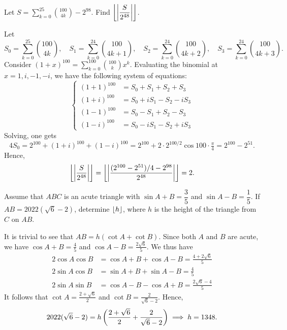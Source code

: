 \begin{question}[2]\label{Q::2021-O-1-14}
    Let $S = \displaystyle\sum_{k=0}^{25} \binom{100}{4k} - 2^{98}$. Find $\left\lfloor \left\lvert \dfrac{S}{2^{48}} \right\rvert \right\rfloor$.
\end{question}
\begin{solution*}
    Let \[S_0 = \sum_{k=0}^{25} \binom{100}{4k}, \quad S_1 = \sum_{k=0}^{24} \binom{100}{4k+1}, \quad S_2 = \sum_{k=0}^{24} \binom{100}{4k+2}, \quad S_3 = \sum_{k=0}^{24} \binom{100}{4k+3}.\] Consider $(1 + x)^{100} = \displaystyle\sum_{k=0}^{100} \binom{100}{k} x^{k}$. Evaluating the binomial at $x = 1, i, -1, -i$, we have the following system of equations: \[\left\{
        \begin{aligned}
            (1+1)^{100} &= S_0 + S_1 + S_2 + S_3\\
            (1+i)^{100} &= S_0 + iS_1 - S_2 - iS_3\\
            (1-1)^{100} &= S_0 - S_1 + S_2 - S_3\\
            (1-i)^{100} &= S_0 - iS_1 - S_2 + iS_3
        \end{aligned}\right.\] Solving, one gets \[4S_0 = 2^{100} + (1+i)^{100} + (1-i)^{100} = 2^{100} + 2 \cdot 2^{100/2}\cos{100 \cdot \tfrac{\pi}4} = 2^{100} - 2^{51}.\] Hence, \[\left\lfloor \left\lvert \frac{S}{2^{48}} \right\rvert \right\rfloor = \left\lfloor \left\lvert \frac{(2^{100} - 2^{51})/4 - 2^{98}}{2^{48}} \right\rvert \right\rfloor = 2.\]
\end{solution*}

\begin{question}[1348]\label{Q::2021-O-1-15}
    Assume that $ABC$ is an acute triangle with $\sin{A + B} = \dfrac35$ and $\sin{A-B} = \dfrac15$. If $AB = 2022(\sqrt6 - 2)$, determine $\left\lfloor h \right\rfloor$, where $h$ is the height of the triangle from $C$ on $AB$.
\end{question}
\begin{solution*}
    It is trivial to see that $AB = h(\cot A + \cot B)$. Since both $A$ and $B$ are acute, we have $\cos{A+B} = \frac45$ and $\cos{A-B} = \frac{2\sqrt{6}}{5}$. We thus have
    \begin{align*}
        2\cos A \cos B &= \cos{A + B} + \cos{A - B} = \frac{4 + 2\sqrt6}{5}\\
        2\sin A \cos B &= \sin{A + B} + \sin{A - B} = \frac45\\
        2\sin A \sin B &= \cos{A-B} - \cos{A+ B} = \frac{2\sqrt6 - 4}{5}
    \end{align*}
    It follows that $\cot A = \frac{2 + \sqrt6}{2}$ and $\cot B = \frac{2}{\sqrt6 - 2}$. Hence, \[2022(\sqrt 6 - 2) = h\left( \frac{2 + \sqrt6}{2} + \frac{2}{\sqrt6 - 2} \right) \implies h = 1348.\]
\end{solution*}

